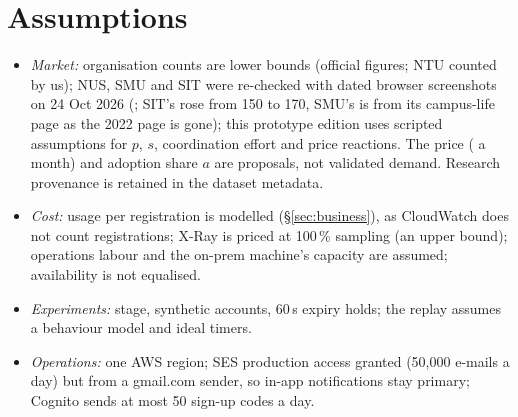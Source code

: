 \section*{Assumptions}
\begin{itemize}
\item \emph{Market:} organisation counts are lower bounds (official figures; NTU counted by us); NUS,
  SMU and SIT were re-checked with dated browser screenshots on 24 Oct 2026
  (; SIT's rose from 150 to 170, SMU's is from its campus-life page
  as the 2022 page is gone); this prototype edition uses scripted assumptions for $p$, $s$,
  coordination effort and price reactions. The price ( a month) and adoption share $a$ are proposals,
  not validated demand. Research provenance is retained in the dataset metadata.
\item \emph{Cost:} usage per registration is modelled (\S\ref{sec:business}), as CloudWatch does
  not count registrations; X-Ray is priced at 100\,\% sampling (an upper bound); operations labour
  and the on-prem machine's capacity are assumed;
  availability is not equalised.
\item \emph{Experiments:}  stage, synthetic accounts, 60\,s expiry holds; the replay
  assumes a behaviour model and ideal timers.
\item \emph{Operations:} one AWS region; SES production access granted (50{,}000 e-mails a day) but
  from a gmail.com sender, so in-app notifications stay primary; Cognito sends at most 50 sign-up codes a day.
\end{itemize}

